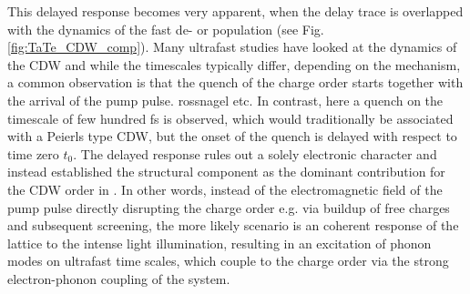 This delayed response becomes very apparent, when the delay trace is overlapped with the dynamics of the fast de- or population (see Fig. \ref{fig:TaTe_CDW_comp}).
Many ultrafast studies have looked at the dynamics of the CDW and while the timescales typically differ, depending on the mechanism, a common observation is that the quench of the charge order starts together with the arrival of the pump pulse. \cite{} rossnagel etc.
In contrast, here a quench on the timescale of few hundred \unit{\femto\second} is observed, which would traditionally be associated with a Peierls type CDW, but the onset of the quench is delayed with respect to time zero $t_0$.
The delayed response rules out a solely electronic character and instead established the structural component as the dominant contribution for the CDW order in .
In other words, instead of the electromagnetic field of the pump pulse directly disrupting the charge order e.g. via buildup of free charges and subsequent screening, the more likely scenario is an coherent response of the lattice to the intense light illumination, resulting in an excitation of phonon modes on ultrafast time scales, which couple to the charge order via the strong electron-phonon coupling of the system.

